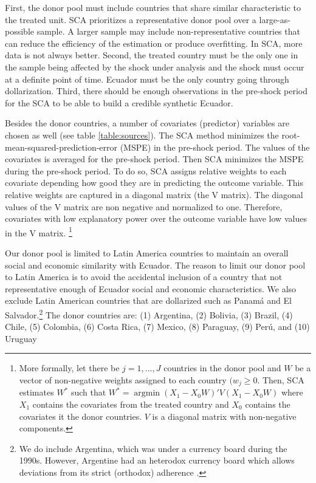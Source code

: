 \documentclass[12pt]{article}
\begin{document}
First, the donor pool must include countries that share similar characteristic to the treated unit. SCA prioritizes a representative donor pool over a large-as-possible sample. A larger sample may include non-representative countries that can reduce the efficiency of the estimation or produce overfitting. In SCA, more data is not always better. Second, the treated country must be the only one in the sample being affected by the shock under analysis and the shock must occur at a definite point of time. Ecuador must be the only country going through dollarization. Third, there should be enough observations in the pre-shock period for the SCA to be able to build a credible synthetic Ecuador.

Besides the donor countries, a number of covariates (predictor) variables are chosen as well (see table \ref{table:sources}). The SCA method minimizes the root-mean-squared-prediction-error (MSPE) in the pre-shock period. The values of the covariates is averaged for the pre-shock period. Then SCA minimizes the MSPE during the pre-shock period. To do so, SCA assigns relative weights to each covariate depending how good they are in predicting the outcome variable. This relative weights are captured in a diagonal matrix (the V matrix). The diagonal values of the V matrix are non negative and normalized to one. Therefore, covariates with low explanatory power over the outcome variable have low values in the V matrix. \footnote{More formally, let there be $j = 1,...,J$ countries in the donor pool and $W$ be a vector of non-negative weights assigned to each country $(w_j \geq 0$. Then, SCA estimates $W^*$ such that $W^* = \operatorname{arg\min} (X_1 - X_0W)'V(X_1 - X_0W)$ where $X_1$ contains the covariates from the treated country and $X_0$ contains the covariates it the donor countries. $V$ is a diagonal matrix with non-negative components.}

Our donor pool is limited to Latin America countries to maintain an overall social and economic similarity with Ecuador. The reason to limit our donor pool to Latin America is to avoid the accidental inclusion of a country that not representative enough of Ecuador social and economic characteristics. We also exclude Latin American countries that are dollarized such as Panamá and El Salvador.\footnote{We do include Argentina, which was under a currency board during the 1990s. However, Argentine had an heterodox currency board which allows deviations from its strict (orthodox) adherence \parencite{Hanke2008}.} The donor countries are: (1) Argentina, (2) Bolivia, (3) Brazil, (4) Chile, (5) Colombia, (6) Costa Rica, (7) Mexico, (8) Paraguay, (9) Perú, and (10) Uruguay
\end{document}

